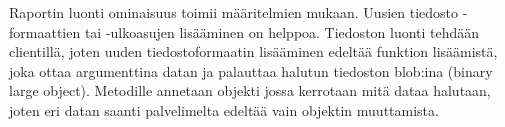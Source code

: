 Raportin luonti ominaisuus toimii määritelmien mukaan.
%
Uusien tiedosto -formaattien tai -ulkoasujen lisääminen on helppoa. 
Tiedoston luonti tehdään clientillä, joten uuden tiedostoformaatin lisääminen edeltää funktion lisäämistä, 
joka ottaa argumenttina datan ja palauttaa halutun tiedoston blob:ina (binary large object).
%
Metodille annetaan objekti jossa kerrotaan mitä dataa halutaan, joten eri datan saanti palvelimelta edeltää vain objektin muuttamista.





